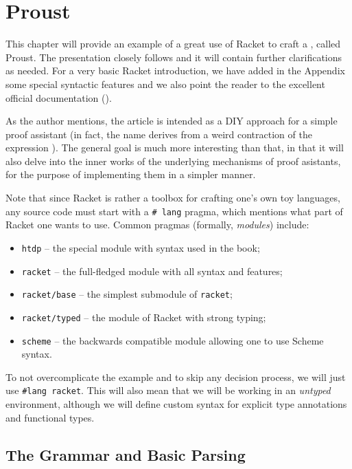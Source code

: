 \chapter{Proust}
\label{ch:proust}

\indent\indent This chapter will provide an example of a great use of Racket to craft
a , called Proust. The presentation closely
follows \cite{proust} and it will contain further clarifications as
needed. For a very basic Racket introduction, we have added in the
Appendix some special syntactic features and we also point the reader
to the excellent official documentation (\cite{racket}).

As the author mentions, the article is intended as a DIY approach
for a simple proof assistant (in fact, the name derives from a weird
contraction of the expression ). The general goal
is much more interesting than that, in that it will also delve into the
inner works of the underlying mechanisms of proof asistants, for the
purpose of implementing them in a simpler manner.

Note that since Racket is rather a toolbox for crafting one's own toy
languages, any source code must start with a \texttt{\#\!\!\! lang} pragma,
which mentions what part of Racket one wants to use. Common pragmas
(formally, \emph{modules}) include:
\begin{itemize}
\item \texttt{htdp} -- the special module with syntax used in the
  \cite{htdp} book;
\item \texttt{racket} -- the full-fledged module with all syntax and features;
\item \texttt{racket/base} -- the simplest submodule of \texttt{racket};
\item \texttt{racket/typed} -- the module of Racket with strong typing;
\item \texttt{scheme} -- the backwards compatible module allowing one
  to use Scheme syntax.
\end{itemize}

To not overcomplicate the example and to skip any decision process,
we will just use \texttt{\#lang racket}. This will also mean that
we will be working in an \emph{untyped} environment, although we will
define custom syntax for explicit type annotations and functional types.

\section{The Grammar and Basic Parsing}


